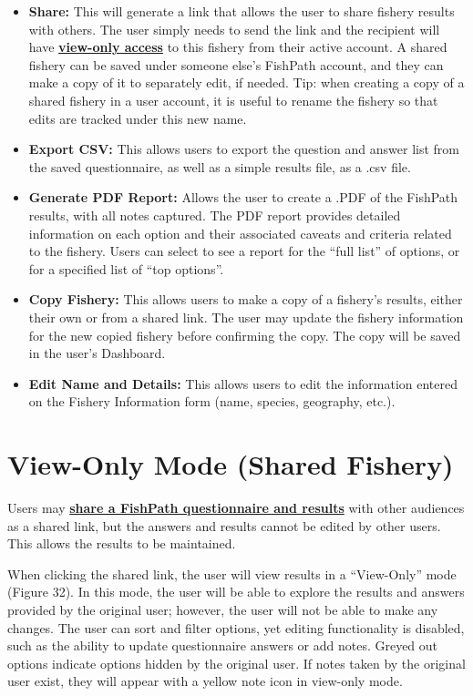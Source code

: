 \documentclass[
  11pt,
]{book}
\providecommand{\tightlist}{%
  \setlength{\itemsep}{0pt}\setlength{\parskip}{0pt}}
\begin{document}
\begin{itemize}
\tightlist
\item
  \textbf{Share:} This will generate a link that allows the user to share fishery results with others. The user simply needs to send the link and the recipient will have \protect\hyperlink{view-only-mode-shared-fishery}{\textbf{view-only access}} to this fishery from their active account. A shared fishery can be saved under someone else's FishPath account, and they can make a copy of it to separately edit, if needed. Tip: when creating a copy of a shared fishery in a user account, it is useful to rename the fishery so that edits are tracked under this new name.
\item
  \textbf{Export CSV:} This allows users to export the question and answer list from the saved questionnaire, as well as a simple results file, as a .csv file.
\item
  \textbf{Generate PDF Report:} Allows the user to create a .PDF of the FishPath results, with all notes captured. The PDF report provides detailed information on each option and their associated caveats and criteria related to the fishery. Users can select to see a report for the ``full list'' of options, or for a specified list of ``top options''.
\item
  \textbf{Copy Fishery:} This allows users to make a copy of a fishery's results, either their own or from a shared link. The user may update the fishery information for the new copied fishery before confirming the copy. The copy will be saved in the user's Dashboard.
\item
  \textbf{Edit Name and Details:} This allows users to edit the information entered on the Fishery Information form (name, species, geography, etc.).
\end{itemize}

\hypertarget{view-only-mode-shared-fishery}{%
\section{View-Only Mode (Shared Fishery)}\label{view-only-mode-shared-fishery}}

Users may \protect\hyperlink{Results-Actions}{\textbf{share a FishPath questionnaire and results}} with other audiences as a shared link, but the answers and results cannot be edited by other users. This allows the results to be maintained.

When clicking the shared link, the user will view results in a ``View-Only'' mode (Figure 32). In this mode, the user will be able to explore the results and answers provided by the original user; however, the user will not be able to make any changes. The user can sort and filter options, yet editing functionality is disabled, such as the ability to update questionnaire answers or add notes. Greyed out options indicate options hidden by the original user. If notes taken by the original user exist, they will appear with a yellow note icon in view-only mode.
\end{document}
